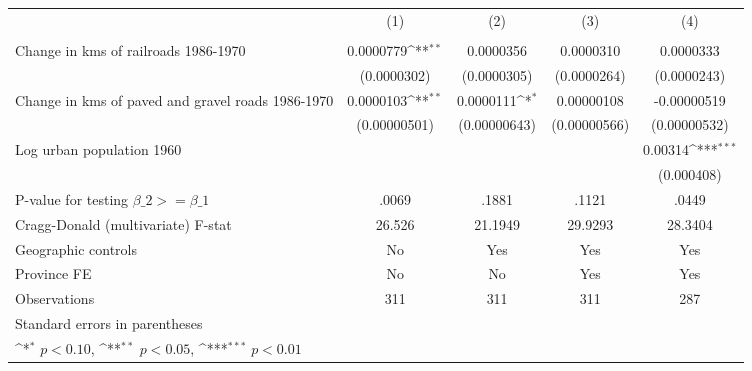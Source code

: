 {
\def\sym#1{\ifmmode^{#1}\else\(^{#1}\)\fi}
\begin{tabular}{l*{4}{c}}
\hline\hline
                &\multicolumn{1}{c}{(1)}&\multicolumn{1}{c}{(2)}&\multicolumn{1}{c}{(3)}&\multicolumn{1}{c}{(4)}\\
                &\multicolumn{1}{c}{}&\multicolumn{1}{c}{}&\multicolumn{1}{c}{}&\multicolumn{1}{c}{}\\
\hline
Change in kms of railroads 1986-1970&0.0000779\sym{**} &0.0000356         &0.0000310         &0.0000333         \\
                &(0.0000302)         &(0.0000305)         &(0.0000264)         &(0.0000243)         \\
[1em]
Change in kms of paved and gravel roads 1986-1970&0.0000103\sym{**} &0.0000111\sym{*}  &0.00000108         &-0.00000519         \\
                &(0.00000501)         &(0.00000643)         &(0.00000566)         &(0.00000532)         \\
[1em]
Log urban population 1960&                  &                  &                  &  0.00314\sym{***}\\
                &                  &                  &                  &(0.000408)         \\
\hline
P-value for testing $\beta\_{2} >= \beta\_{1}$&    .0069         &    .1881         &    .1121         &    .0449         \\
Cragg-Donald (multivariate) F-stat&   26.526         &  21.1949         &  29.9293         &  28.3404         \\
Geographic controls&       No         &      Yes         &      Yes         &      Yes         \\
Province FE     &       No         &       No         &      Yes         &      Yes         \\
Observations    &      311         &      311         &      311         &      287         \\
\hline\hline
\multicolumn{5}{l}{\footnotesize Standard errors in parentheses}\\
\multicolumn{5}{l}{\footnotesize \sym{*} \(p<0.10\), \sym{**} \(p<0.05\), \sym{***} \(p<0.01\)}\\
\end{tabular}
}
